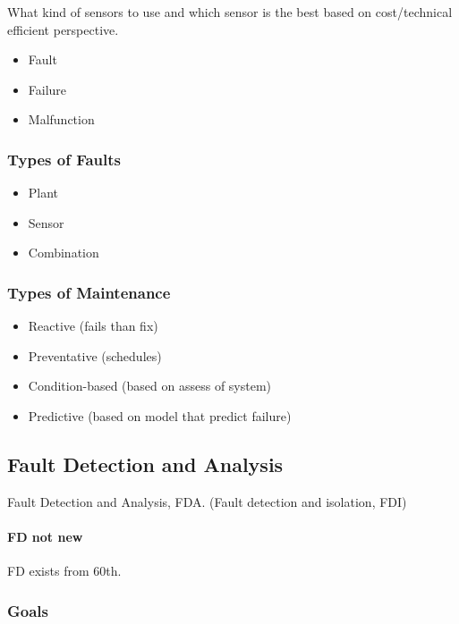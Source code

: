 \documentclass[class=article, crop=false]{standalone}
\begin{document}
What kind of sensors to use and which sensor is the best based on
cost/technical efficient perspective.

\begin{itemize}
    \item Fault
    \item Failure   
    \item Malfunction
\end{itemize}



\subsubsection{Types of Faults}
\begin{itemize}
    \item Plant
    \item Sensor
    \item Combination
\end{itemize}

\subsubsection{Types of Maintenance}
\begin{itemize}
    \item{Reactive (fails than fix)}
    \item{Preventative (schedules)}
    \item{Condition-based (based on assess of system)}
    \item{Predictive (based on model that predict failure)}
\end{itemize}






% 

\subsection{Fault Detection and Analysis}
Fault Detection and Analysis, FDA. (Fault detection and isolation, FDI) 

\paragraph{FD not new}
FD exists from 60th.

\subsubsection{Goals}
\end{document}
